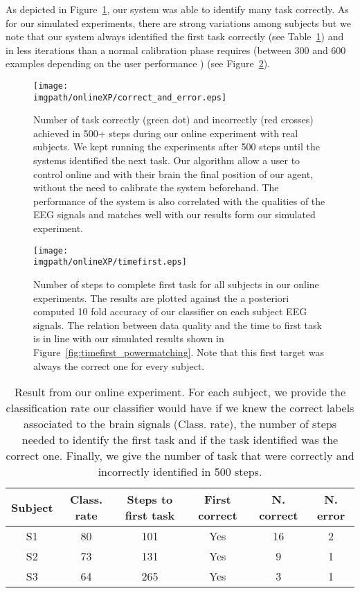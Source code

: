 As depicted in Figure~\ref{fig:correcterror_online}, our system was able to identify many task correctly. As for our simulated experiments, there are strong variations among subjects but we note that our system  always identified the first task correctly (see Table~\ref{tab:onlineXPsummary}) and in less iterations than a normal calibration phase requires (between 300 and 600 examples depending on the user performance \cite{chavarriaga2010learning,iturrate2010single}) (see Figure~\ref{fig:timefirst_online}).


\begin{figure}[!ht]
\centering
\texttt{[image: \\imgpath/onlineXP/correct\_and\_error.eps]}
\caption{Number of task correctly (green dot) and incorrectly (red crosses) achieved in 500+ steps during our online experiment with real subjects. We kept running the experiments after 500 steps until the systems identified the next task. Our algorithm allow a user to control online and with their brain the final position of our agent, without the need to calibrate the system beforehand. The performance of the system is also correlated with the qualities of the EEG signals and matches well with our results form our simulated experiment.}
\label{fig:correcterror_online}
\end{figure} 


\begin{figure}[!ht]
\centering
\texttt{[image: \\imgpath/onlineXP/timefirst.eps]}
\caption{Number of steps to complete first task for all subjects in our online experiments. The results are plotted against the a posteriori computed 10 fold accuracy of our classifier on each subject EEG signals. The relation between data quality and the time to first task is in line with our simulated results shown in Figure~\ref{fig:timefirst_powermatching}. Note that this first target was always the correct one for every subject.}
\label{fig:timefirst_online}
\end{figure} 


\begin{table}
\centering
{}
\begin{tabular}{c c c c c c}
    Subject & Class. rate & Steps to first task & First correct & N. correct & N. error\\ \hline
    S1 & 80 & 101 & Yes & 16 & 2\\ 
    S2 & 73 & 131 & Yes & 9 & 1\\
    S3 & 64 & 265 & Yes & 3 & 1\\
\end{tabular}
\caption{Result from our online experiment. For each subject, we provide the classification rate our classifier would have if we knew the correct labels associated to the brain signals (Class. rate), the number of steps needed to identify the first task and if the task identified was the correct one. Finally, we give the number of task that were correctly and incorrectly identified in 500 steps.} 
\label{tab:onlineXPsummary}
\end{table}

